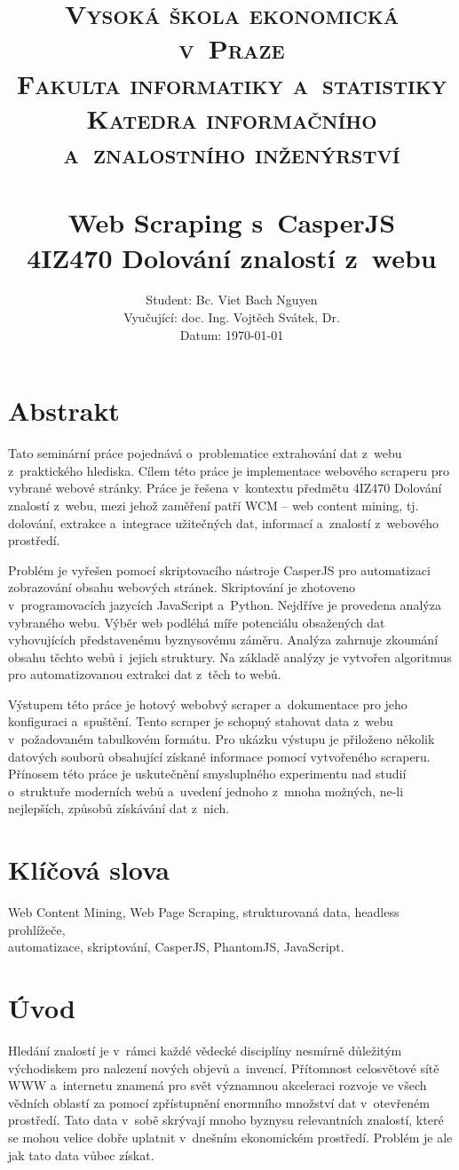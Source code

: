 \documentclass[11pt,a4paper]{article}
\title{   \normalsize\textsc {
          \large{Vysoká škola ekonomická v~Praze}\\[0.3cm]    
          \large{Fakulta informatiky a~statistiky}\\[0.3cm]
          \large{Katedra informačního a~znalostního inženýrství}\\
        }
\textsc{}                                               %
            \\[7.0cm]                                   %
            \huge \textbf{Web Scraping s~CasperJS}      %
            \HRule{2pt} \\ [0.4cm]                      %
            \normalsize \textbf{4IZ470 Dolování znalostí z~webu}
        }
\author{\raggedright
        Student: Bc. Viet Bach Nguyen \\
        Vyučující: doc. Ing. Vojtěch Svátek, Dr. \\
        Datum: \today
}
\makeatletter
\def\printtitle{                       
    {\centering \@title\par}}
\def\printauthor{                   
    {\centering \large \@author}}
\makeatother
\begin{document}
\thispagestyle{empty}           %

\printtitle                     %
      \vfill
\printauthor                    %
\newpage


\setcounter{page}{1}

\section*{Abstrakt}
Tato seminární práce pojednává o~problematice extrahování dat z~webu z~praktického hlediska. Cílem této práce je implementace webového scraperu pro vybrané webové stránky. Práce je řešena v~kontextu předmětu 4IZ470 Dolování znalostí z~webu, mezi jehož zaměření patří WCM -- web content mining, tj. dolování, extrakce a~integrace užitečných dat, informací a~znalostí z~webového prostředí. 

Problém je vyřešen pomocí skriptovacího nástroje CasperJS pro automatizaci zobrazování obsahu webových stránek. Skriptování je zhotoveno v~programovacích jazycích JavaScript a~Python. Nejdříve je provedena analýza vybraného webu. Výběr web podléhá míře potenciálu obsažených dat vyhovujících představenému byznysovému záměru. Analýza zahrnuje zkoumání obsahu těchto webů i~jejich struktury. Na základě analýzy je vytvořen algoritmus pro automatizovanou extrakci dat z~těch to webů. 

Výstupem této práce je hotový webobvý scraper a~dokumentace pro jeho konfiguraci a~spuštění. Tento scraper je schopný stahovat data z~webu v~požadovaném tabulkovém formátu. Pro ukázku výstupu je přiloženo několik datových souborů obsahující získané informace pomocí vytvořeného scraperu. Přínosem této práce je uskutečnění smysluplného experimentu nad studií o~struktuře moderních webů a~uvedení jednoho z~mnoha možných, ne-li nejlepších, způsobů získávání dat z~nich.

\section*{Klíčová slova}
Web Content Mining, Web Page Scraping, strukturovaná data, headless prohlížeče,\\ automatizace, skriptování, CasperJS, PhantomJS, JavaScript.

\newpage

 
\tableofcontents

\newpage

\section{Úvod}
Hledání znalostí je v~rámci každé vědecké disciplíny nesmírně důležitým východiskem pro nalezení nových objevů a~invencí. Přítomnost celosvětové sítě WWW a~internetu znamená pro svět významnou akceleraci rozvoje ve všech vědních oblastí za pomocí zpřístupnění enormního množství dat v~otevřeném prostředí. Tato data v~sobě skrývají mnoho byznysu relevantních znalostí, které se mohou velice dobře uplatnit v~dnešním ekonomickém prostředí. Problém je ale jak tato data vůbec získat.
\end{document}
